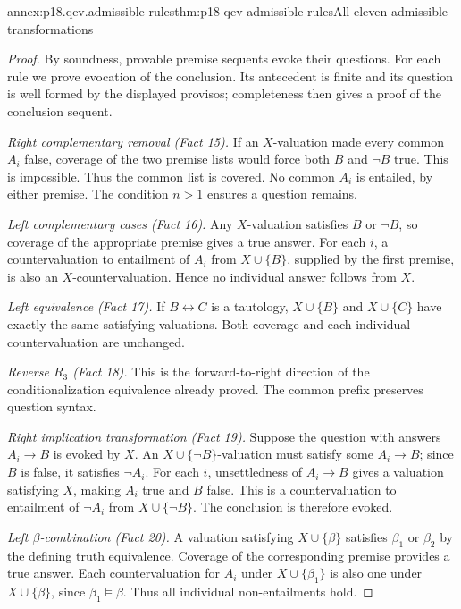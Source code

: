 \begin{annexitem}{annex:p18.qev.admissible-rules}{thm:p18-qev-admissible-rules}{All eleven admissible transformations}
\begin{proof}
By soundness, provable premise sequents evoke their questions.
For each rule we prove evocation of the conclusion. Its antecedent
is finite and its question is well formed by the displayed provisos;
completeness then gives a proof of the conclusion sequent.

\emph{Right complementary removal (Fact 15).} If an \(X\)-valuation
made every common \(A_i\) false, coverage of the two premise lists
would force both \(B\) and \(\neg B\) true. This is impossible.
Thus the common list is covered. No common \(A_i\) is entailed,
by either premise. The condition \(n>1\) ensures a question remains.

\emph{Left complementary cases (Fact 16).} Any \(X\)-valuation
satisfies \(B\) or \(\neg B\), so coverage of the appropriate
premise gives a true answer. For each \(i\), a countervaluation
to entailment of \(A_i\) from \(X\cup\{B\}\), supplied by
the first premise, is also an \(X\)-countervaluation. Hence no
individual answer follows from \(X\).

\emph{Left equivalence (Fact 17).} If \(B\leftrightarrow C\)
is a tautology, \(X\cup\{B\}\) and \(X\cup\{C\}\)
have exactly the same satisfying valuations. Both coverage and each
individual countervaluation are unchanged.

\emph{Reverse \(R_3\) (Fact 18).} This is the forward-to-right
direction of the conditionalization equivalence already proved.
The common prefix preserves question syntax.

\emph{Right implication transformation (Fact 19).} Suppose the
question with answers \(A_i\to B\) is evoked by \(X\).
An \(X\cup\{\neg B\}\)-valuation must satisfy some
\(A_i\to B\); since \(B\) is false, it satisfies \(\neg A_i\).
For each \(i\), unsettledness of \(A_i\to B\) gives a
valuation satisfying \(X\), making \(A_i\) true and \(B\)
false. This is a countervaluation to entailment of \(\neg A_i\)
from \(X\cup\{\neg B\}\). The conclusion is therefore evoked.

\emph{Left \(\beta\)-combination (Fact 20).} A valuation satisfying
\(X\cup\{\beta\}\) satisfies \(\beta_1\) or \(\beta_2\)
by the defining truth equivalence. Coverage of the corresponding
premise provides a true answer. Each countervaluation for \(A_i\)
under \(X\cup\{\beta_1\}\) is also one under
\(X\cup\{\beta\}\), since \(\beta_1\models\beta\).
Thus all individual non-entailments hold.


\end{proof}
\end{annexitem}
